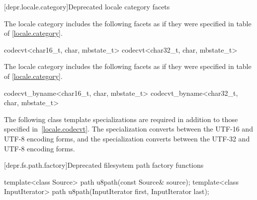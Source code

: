 [depr.locale.category]{Deprecated locale category facets}

\pnum
The  locale category includes the following facets
as if they were specified
in table  of \ref{locale.category}.

\begin{codeblock}
codecvt<char16_t, char, mbstate_t>
codecvt<char32_t, char, mbstate_t>
\end{codeblock}

\pnum
The  locale category includes the following facets
as if they were specified
in table  of \ref{locale.category}.

\begin{codeblock}
codecvt_byname<char16_t, char, mbstate_t>
codecvt_byname<char32_t, char, mbstate_t>
\end{codeblock}

\pnum
The following class template specializations are required
in addition to those specified in~\ref{locale.codecvt}.
The specialization 
converts between the UTF-16 and UTF-8 encoding forms, and
the specialization 
converts between the UTF-32 and UTF-8 encoding forms.

[depr.fs.path.factory]{Deprecated filesystem path factory functions}

%
\begin{itemdecl}
template<class Source>
  path u8path(const Source& source);
template<class InputIterator>
  path u8path(InputIterator first, InputIterator last);
\end{itemdecl}

